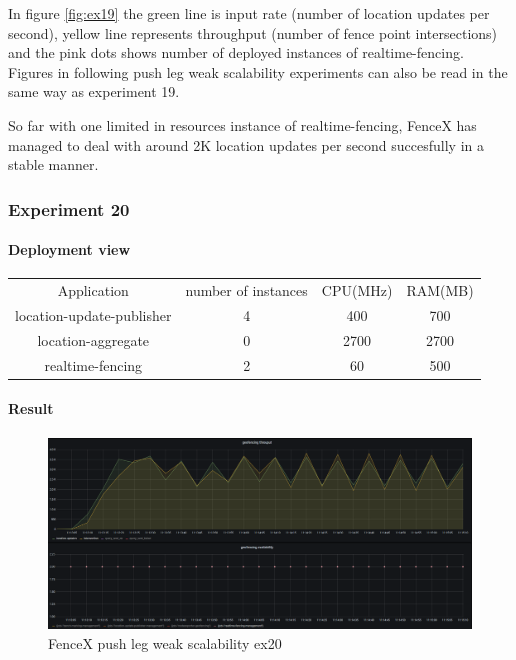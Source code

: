 \documentclass[a4]{report}
\begin{document}
    In figure \ref{fig:ex19} the green line is input rate (number of location updates per second),
    yellow line represents throughput (number of fence point intersections) and the pink dots shows number of
    deployed instances of realtime-fencing.
    Figures in following push leg weak scalability experiments can also be read in the same way as experiment 19.

    So far with one limited in resources instance of realtime-fencing, FenceX has managed to deal with around 2K
    location updates per second succesfully in a stable manner.

    \subsubsection{Experiment 20}

    \paragraph{Deployment view}
    \begin{center}
        \begin{tabular}{ c c c c }
            Application               & number of instances & CPU(MHz) & RAM(MB) \\
            location-update-publisher & 4                   & 400      & 700     \\
            location-aggregate        & 0                   & 2700     & 2700    \\
            realtime-fencing          & 2                   & 60       & 500     \\
        \end{tabular}
    \end{center}

    \paragraph{Result}
    \begin{figure}[ht]
        \caption{FenceX push leg weak scalability ex20}
        \label{fig:ex20}
        \includegraphics[scale=0.4]{images/evaluation/ex20-benchmarking-ongoing-1per10sec.png}
    \end{figure}
\end{document}
